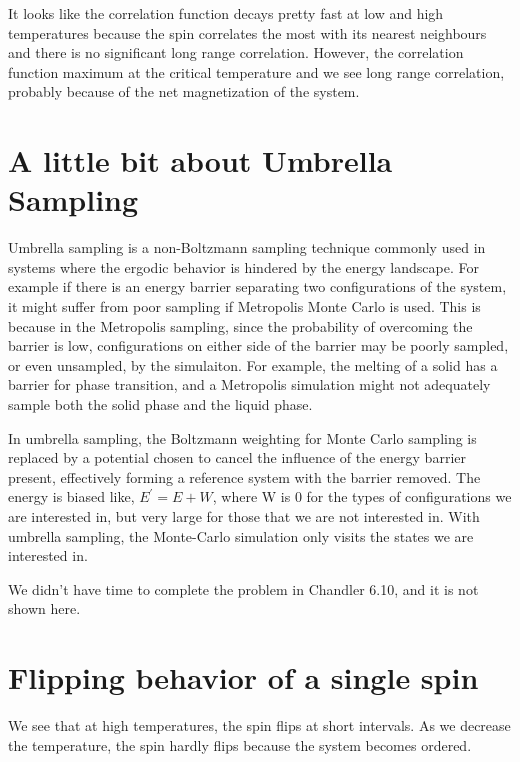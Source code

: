\documentclass{article}
\begin{document}
It looks like the correlation function decays pretty fast at low and high temperatures because the spin correlates the most with its nearest neighbours and there is no significant long range correlation. However, the correlation function maximum at the critical temperature and we see long range correlation, probably because of the net magnetization of the system.


\section{A little bit about Umbrella Sampling}
\label{sec-8}

Umbrella sampling is a non-Boltzmann sampling technique commonly used in systems where the ergodic behavior is hindered by the energy landscape. For example if there is an energy barrier separating two configurations of the system, it might suffer from poor sampling if Metropolis Monte Carlo is used. This is because in the Metropolis sampling, since the probability of overcoming the barrier is low, configurations on either side of the barrier may be poorly sampled, or even unsampled, by the simulaiton. For example, the melting of a solid has a barrier for phase transition, and a Metropolis simulation might not adequately sample both the solid phase and the liquid phase.

In umbrella sampling, the Boltzmann weighting for Monte Carlo sampling is replaced by a potential chosen to cancel the influence of the energy barrier present, effectively forming a reference system with the barrier removed. The energy is biased like, \( E^{\prime} = E + W \), where W is 0 for the types of configurations we are interested in, but very large for those that we are not interested in. With umbrella sampling, the Monte-Carlo simulation only visits the states we are interested in.

We didn't have time to complete the problem in Chandler 6.10, and it is not shown here.


\section{Flipping behavior of a single spin}
\label{sec-9}

We see that at high temperatures, the spin flips at short intervals. As we decrease the temperature, the spin hardly flips because the system becomes ordered.
\end{document}
